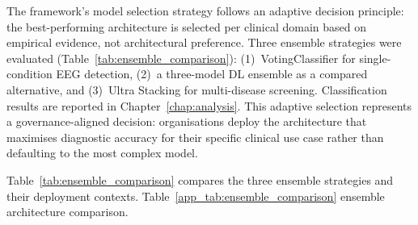 \label{app_sec:dl_ensemble}
\label{app_sec:ultra_stacking}

The framework's model selection strategy follows an adaptive decision principle: the best-performing architecture is selected per clinical domain based on empirical evidence, not architectural preference. Three ensemble strategies were evaluated (Table~\ref{tab:ensemble_comparison}): (1)~VotingClassifier for single-condition EEG detection, (2)~a three-model DL ensemble as a compared alternative, and (3)~Ultra Stacking for multi-disease screening. Classification results are reported in Chapter~\ref{chap:analysis}. This adaptive selection represents a governance-aligned decision: organisations deploy the architecture that maximises diagnostic accuracy for their specific clinical use case rather than defaulting to the most complex model.

Table~\ref{tab:ensemble_comparison} compares the three ensemble strategies and their deployment contexts.
\noindent Table~\ref{app_tab:ensemble_comparison} ensemble architecture comparison.

